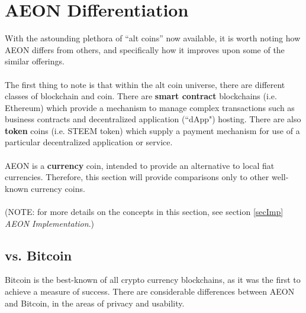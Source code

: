 \section{AEON Differentiation}

With the astounding plethora of “alt coins” now available, it is worth noting how AEON differs from others, and specifically how it improves upon some of the similar offerings.\\
\\
The first thing to note is that within the alt coin universe, there are different classes of blockchain and coin.  There are \textbf{smart contract} blockchains (i.e. Ethereum) which provide a mechanism to manage complex transactions such as business contracts and decentralized application (“dApp") hosting.  There are also \textbf{token} coins (i.e. STEEM token) which supply a payment mechanism for use of a particular decentralized application or service.\\
\\ 
AEON is a \textbf{currency} coin, intended to provide an alternative to local fiat currencies.  Therefore, this section will provide comparisons only to other well-known currency coins.\\
\\
(NOTE: for more details on the concepts in this section, see section \ref{secImp} \textit{AEON Implementation}.)

\subsection{vs. Bitcoin}
\label{secVsBitcoin}
Bitcoin is the best-known of all crypto currency blockchains, as it was the first to achieve a measure of success. There are considerable differences between AEON and Bitcoin, in the areas of privacy and usability.


